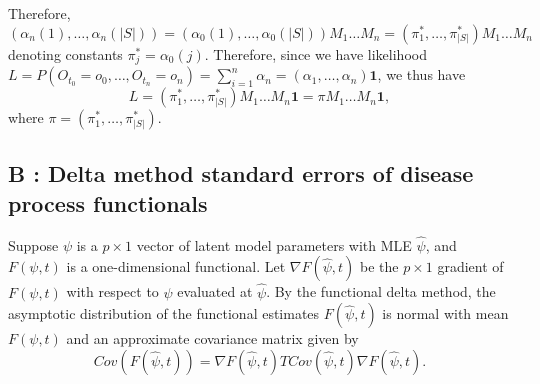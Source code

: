 \documentclass{uwstat572}
\begin{document}
Therefore,
\[
\left(\alpha_{n}(1),\ldots,\alpha_{n}(|S|)\right)=\left(\alpha_{0}(1),\ldots,\alpha_{0}(|S|)\right)M_1\ldots M_n = \left(\pi_1^*,\ldots,\pi_{|S|}^*\right) M_1\ldots M_n
\]
denoting constants $\pi_j^*=\alpha_{0}(j)$.
Therefore, since we have likelihood $L=P(O_{t_0}=o_0,\ldots,O_{t_n}=o_n)=\sum_{i=1}^n\alpha_n = \left(\alpha_1,\ldots,\alpha_n\right)\mathbf{1}$, we thus have
\[
L=\left(\pi_1^*,\ldots,\pi_{|S|}^*\right) M_1\ldots M_n \mathbf{1} = \pi M_1\ldots M_n \mathbf{1},
\] where $\pi=\left(\pi_1^*,\ldots,\pi_{|S|}^*\right)$.
\subsection*{B : Delta method standard errors of disease process functionals}
Suppose $\psi$ is a $p\times 1$ vector of latent model parameters with MLE $\hat{\psi}$, and $F(\psi, t)$ is a one-dimensional functional. Let $\nabla F (\hat{ψ}, t)$ be the $p \times 1$ gradient of $F (\psi, t)$ with respect to $\psi$ evaluated at $\hat{\psi}$. By the functional delta method, the asymptotic distribution of the functional estimates $F(\hat{\psi},t)$ is normal with mean $F(\psi,t)$ and an approximate covariance matrix given by
\[
Cov(F(\hat{\psi},t))=\nabla F(\hat{\psi},t)T Cov(\hat{\psi},t)\nabla F(\hat{\psi},t).
\]
\end{document}
